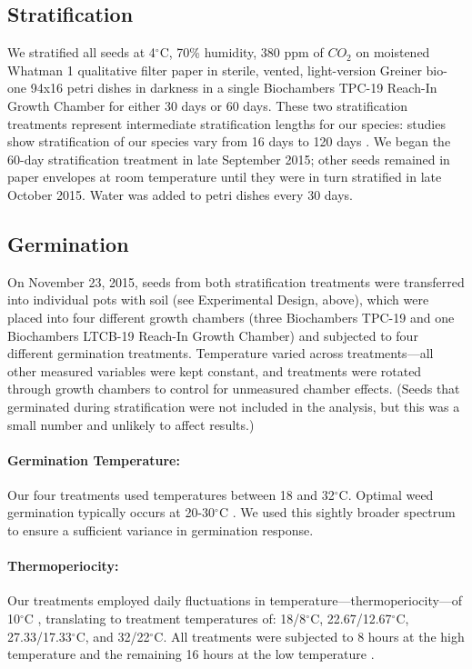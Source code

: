 \documentclass[12pt]{article}\usepackage[]{graphicx}\usepackage[]{color}
\begin{document}
	\subsection{Stratification} 
	We stratified all seeds at 4$^\circ$C, 70\% humidity, 380 ppm of $CO_2$ \parencite[e.g.,][]{Meekins1999,Popay1970} on moistened Whatman 1 qualitative filter paper in sterile, vented, light-version Greiner bio-one 94x16 petri dishes in darkness \parencite{Baskin1998,Popay1970} in a single Biochambers TPC-19 Reach-In Growth Chamber for either 30 days or 60 days. These two stratification treatments represent intermediate stratification lengths for our species: studies show stratification of our species vary from 16 days \parencite{Popay1970} to 120 days \parencite{Meekins1999}. We began the 60-day stratification treatment in late September 2015; other seeds remained in paper envelopes at room temperature until they were in turn stratified in late October 2015.  Water was added to petri dishes every 30 days.
	
	\subsection{Germination}
	On November 23, 2015, seeds from both stratification treatments were transferred into individual pots with soil (see Experimental Design, above), which were placed into four different growth chambers (three Biochambers TPC-19 and one Biochambers LTCB-19 Reach-In Growth Chamber) and subjected to four different germination treatments. Temperature varied across treatments---all other measured variables were kept constant, and treatments were rotated through growth chambers to control for unmeasured chamber effects. (Seeds that germinated during stratification were not included in the analysis, but this was a small number and unlikely to affect results.)
	
	\paragraph{Germination Temperature:} Our four treatments used temperatures between 18 and 32$^\circ$C. Optimal weed germination typically occurs at 20-30$^\circ$C \parencite{Hartmann2010,Steinbauer1957,Wulff1994,Popay1970}. We used this  sightly broader spectrum to ensure a sufficient variance in germination response.
	
	\paragraph{Thermoperiocity:} Our treatments employed daily fluctuations in temperature---thermoperiocity---of 10$^\circ$C \parencite[see e.g.,][]{Steinbauer1957, Toole1963,ISTA1954}, translating to treatment temperatures of: 18/8$^\circ$C, 22.67/12.67$^\circ$C, 27.33/17.33$^\circ$C, and 32/22$^\circ$C. All treatments were subjected to 8 hours at the high temperature and the remaining 16 hours at the low temperature \parencite{Baskin1998,Roberts1981,Popay1970,Probert2000}. %
\end{document}
